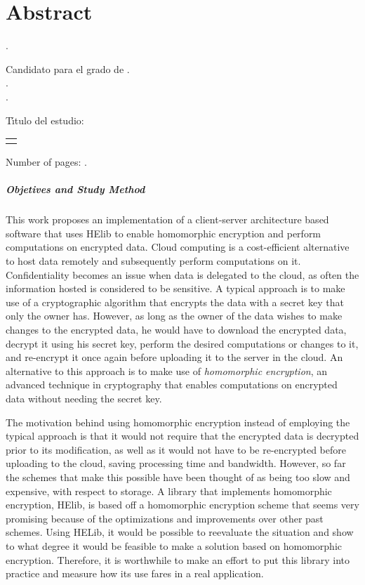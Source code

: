 \chapter{Abstract}

\noindent\autor.

\noindent Candidato para el grado de \grado. \\
\noindent\uanl.\\
\noindent\fime.

\noindent T\'{\i}tulo del estudio: 
\begin{center}
\begin{tabular}{p{13cm}}
	\centering
	\scshape{\large{\titulo}}
\end{tabular}
\end{center} %

\noindent Number of pages: \pageref{LastPage}.

\paragraph{Objetives and Study Method}
This work proposes an implementation of a client-server architecture based software that uses HElib to enable homomorphic encryption and perform computations on encrypted data. Cloud computing is a cost-efficient alternative to host data remotely and subsequently perform computations on it. Confidentiality becomes an issue when data is delegated to the cloud, as often the information hosted is considered to be sensitive. A typical approach is to make use of a cryptographic algorithm that encrypts the data with a secret key that only the owner has. However, as long as the owner of the data wishes to make changes to the encrypted data, he would have to download the encrypted data, decrypt it using his secret key, perform the desired computations or changes to it, and re-encrypt it once again before uploading it to the server in the cloud. An alternative to this approach is to make use of \emph{homomorphic encryption}, an advanced technique in cryptography that enables computations on encrypted data without needing the secret key.

The motivation behind using homomorphic encryption instead of employing the typical approach is that it would not require that the encrypted data is decrypted prior to its modification, as well as it would not have to be re-encrypted before uploading to the cloud, saving processing time and bandwidth. However, so far the schemes that make this possible have been thought of as being too slow and expensive, with respect to storage. A library that implements homomorphic encryption, HElib, is based off a homomorphic encryption scheme that seems very promising because of the optimizations and improvements over other past schemes. Using HELib, it would be possible to reevaluate the situation and show to what degree it would be feasible to make a solution based on homomorphic encryption. Therefore, it is worthwhile to make an effort to put this library into practice and measure how its use fares in a real application.

